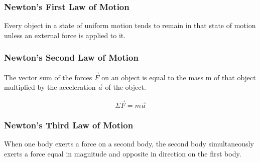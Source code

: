 \documentclass{article}
\begin{document}
\subsubsection{Newton's First Law of Motion}

Every object in a state of uniform motion tends to remain in that state of motion unless an external force is applied to it.

\subsubsection{Newton's Second Law of Motion}

The vector sum of the forces $\vec{F}$ on an object is equal to the mass m of that object multiplied by the acceleration $\vec{a}$ of the object.

\[\Sigma\vec{F}=m\vec{a}\]

\subsubsection{Newton's Third Law of Motion}

When one body exerts a force on a second body, the second body simultaneously exerts a force equal in magnitude and opposite in direction on the first body.
\end{document}
